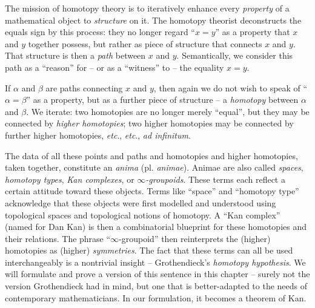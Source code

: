 

\minidiv

\noindent The mission of homotopy theory is to iteratively enhance every \emph{property} of a mathematical object to \emph{structure} on it.
The homotopy theorist deconstructs the equals sign by this process:
they no longer regard \enquote{$x = y$} as a property that $x$ and $y$ together possess,
but rather as piece of structure that connects $x$ and $y$.
That structure is then a \emph{path} between $x$ and $y$.
Semantically, we consider this path as a \enquote{reason} for -- or as a \enquote{witness} to -- the equality $x = y$.

If $\alpha$ and $\beta$ are paths connecting $x$ and $y$,
then again we do not wish to speak of \enquote{$\alpha = \beta$} as a property,
but as a further piece of structure -- a \emph{homotopy} between $\alpha$ and $\beta$.
We iterate: two homotopies are no longer merely \enquote{equal}, but they may be connected by \emph{higher homotopies};
two higher homotopies may be connected by further higher homotopies, \emph{etc}., \emph{etc}., \emph{ad infinitum}.

The data of all these points and paths and homotopies and higher homotopies, taken together, constitute an \emph{anima} (pl. \emph{animae}).
Animae are also called \emph{spaces}, \emph{homotopy types}, \emph{Kan complexes}, or \emph{$\infty$-groupoids}.
These terms each reflect a certain attitude toward these objects.
Terms like \enquote{space} and \enquote{homotopy type} acknowledge that these objects were first modelled and understood using topological spaces and topological notions of homotopy.
A \enquote{Kan complex} (named for Dan Kan) is then a combinatorial blueprint for these homotopies and their relations.
The phrase \enquote{$\infty$-groupoid} then reinterprets the (higher) homotopies as (higher) \emph{symmetries}.
The fact that these terms can all be used interchangeably is a nontrivial insight -- Grothendieck's \emph{homotopy hypothesis}.
We will formulate and prove a version of this sentence in this chapter -- surely not the version Grothendieck had in mind,
but one that is better-adapted to the needs of contemporary mathematicians.
In our formulation, it becomes a theorem of Kan.

